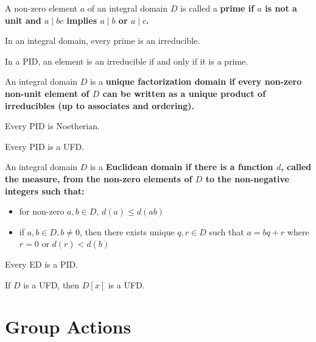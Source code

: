 \documentclass{hmwk}
\begin{document}
\begin{defn}
A non-zero element $a$ of an integral domain $D$ is called a \bf{prime} if $a$ is not a unit and $a \mid bc$ implies $a \mid b$ or $a \mid c$.
\end{defn}

\begin{prop}
In an integral domain, every prime is an irreducible.
\end{prop}

\begin{prop}
In a PID, an element is an irreducible if and only if it is a prime.
\end{prop}

\begin{defn}
An integral domain $D$ is a \bf{unique factorization domain} if every non-zero non-unit element of $D$ can be written as a unique product of irreducibles (up to associates and ordering).
\end{defn}

\begin{prop}
Every PID is Noetherian.
\end{prop}

\begin{prop}
Every PID is a UFD.
\end{prop}

\begin{defn}
An integral domain $D$ is a \bf{Euclidean domain} if there is a function $d$, called the \bf{measure}, from the non-zero elements of $D$ to the non-negative integers such that:
\begin{itemize}
    \item for non-zero $a, b \in D$, $d(a) \leq d(ab)$
    \item if $a, b \in D, b \neq 0$, then there exists unique $q, r \in D$ such that $a = bq + r$ where $r = 0$ or $d(r) < d(b)$
\end{itemize}
\end{defn}

\begin{prop}
Every ED is a PID.
\end{prop}

\begin{prop}
If $D$ is a UFD, then $D[x]$ is a UFD.
\end{prop}

\newpage

\section{Group Actions}
\end{document}
